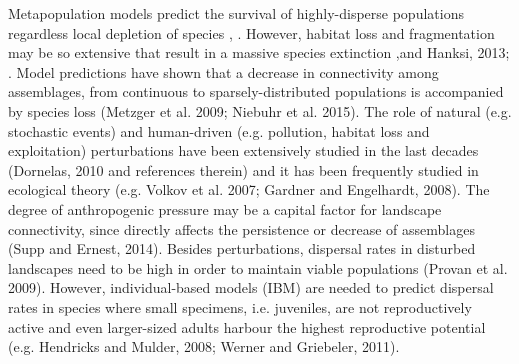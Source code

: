 \documentclass[12pt]{article}
\begin{document}
\begin{flushleft}
Metapopulation models predict the survival of highly-disperse populations regardless local depletion of species \cite{hanski1999habitat}, \cite{akccakaya2007role}. However, habitat loss and fragmentation may be so extensive that result in a massive species extinction \cite{montoya2008habitat},\citeRybicki and Hanksi, 2013; \cite{haddad2015habitat}. Model predictions have shown that a decrease in connectivity among assemblages, from continuous to sparsely-distributed populations is accompanied by species loss (Metzger et al. 2009; Niebuhr et al. 2015). The role of natural (e.g. stochastic events) and human-driven (e.g. pollution, habitat loss and exploitation) perturbations have been extensively studied in the last decades (Dornelas, 2010 and references therein) and it has been frequently studied in ecological theory (e.g. Volkov et al. 2007; Gardner and Engelhardt, 2008). The degree of anthropogenic pressure may be a capital factor for landscape connectivity, since directly affects the persistence or decrease of assemblages (Supp and Ernest, 2014). Besides perturbations, dispersal rates in disturbed landscapes need to be high in order to maintain viable populations (Provan et al. 2009). However, individual-based models (IBM) are needed to predict dispersal rates in species where small specimens, i.e. juveniles, are not reproductively active and even larger-sized adults harbour the highest reproductive potential (e.g. Hendricks and Mulder, 2008; Werner and Griebeler, 2011). 

\end{flushleft}
\end{document}
